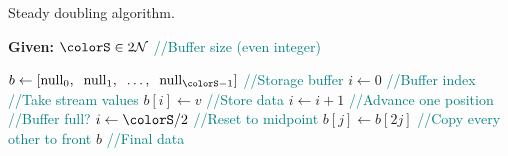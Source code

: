 \begin{algorithm}[H]
\caption{Steady doubling algorithm.}
\label{alg:steady-doubling}
\begin{minipage}{0.5\textwidth}
    \hspace*{\algorithmicindent} \textbf{Given:} $\colorS \in 2\mathcal{N}$ \textcolor{teal}{\small//Buffer size (even integer)}
    \hspace*{\algorithmicindent}    \begin{algorithmic}[1]
        \State $b \gets [\mathrm{null}_0,\;\; \mathrm{null}_1,\;\; \ldots, \;\; \mathrm{null}_{\colorS - 1}]$ \textcolor{teal}{\small//Storage buffer}
        \State $i \gets 0$ \textcolor{teal}{\small//Buffer index}
         \textcolor{teal}{\small//Take stream values}
        \State $b[i] \gets v$ \textcolor{teal}{\small//Store data}
        \State $i \gets i + 1$  \textcolor{teal}{\small//Advance one position}
         \textcolor{teal}{\small//Buffer full?}
        \State $i \gets \colorS / 2$ \textcolor{teal}{\small//Reset to midpoint}
        \For{$j \in [0\twodots \colorS/2)$}
        \State $b[j] \gets b[2j]$ \textcolor{teal}{\small//Copy every other to front}
        \EndFor
        \EndIf
        \EndFor
        \Return $b$ \textcolor{teal}{\small//Final data}
    \end{algorithmic}
\end{minipage}
\end{algorithm}
